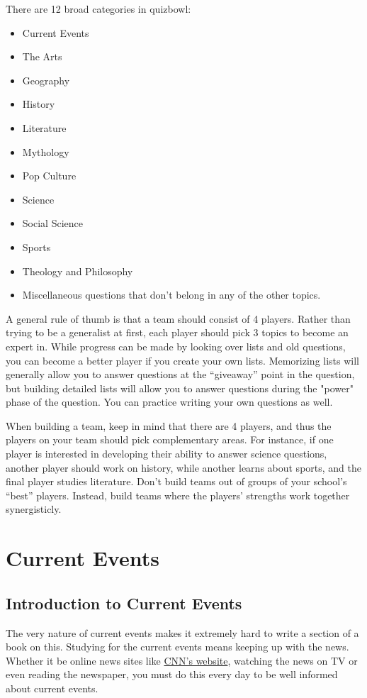 \documentclass[12pt]{book}
\begin{document}
There are 12 broad categories in quizbowl:
\begin{multicols}{2}
\begin{itemize}
	\item Current Events
	\item The Arts
	\item Geography
	\item History
	\item Literature
	\item Mythology
	\item Pop Culture
	\item Science
	\item Social Science
	\item Sports
	\item Theology and Philosophy
	\item Miscellaneous questions that don't belong in any of the other topics.
\end{itemize}
\end{multicols}
A general rule of thumb is that a team should consist of 4 players.  Rather than trying to be a generalist at first, each player should pick 3 topics to become an expert in.  While progress can be made by looking over lists and old questions, you can become a better player if you create your own lists.   Memorizing lists will generally allow you to answer questions at the ``giveaway'' point in the question, but building detailed lists will allow you to answer questions during the "power" phase of the question.  You can practice writing your own questions as well.  

When building a team, keep in mind that there are 4 players, and thus the players on your team should pick complementary areas.  For instance, if one player is interested in developing their ability to answer science questions, another player should work on history, while another learns about sports, and the final player studies literature.  Don't build teams out of groups of your school's ``best'' players.  Instead, build teams where the players' strengths work together synergisticly. 




 

\chapter{Current Events}
	\section{Introduction to Current Events}
		The very nature of current events makes it extremely hard to write a section of a book on this.  Studying for the current events means keeping up with the news.  Whether it be online news sites like \href{http://www.cnn.com}{CNN's website}, watching the news on TV or even reading the newspaper, you must do this every day to be well informed about current events.  
		
\end{document}
